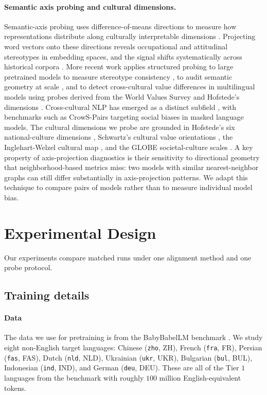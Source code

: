 \documentclass[11pt]{article}
\newcommand{\ZHtag}{\textsc{ZH}}
\newcommand{\FRtag}{\textsc{FR}}
\newcommand{\FAStag}{\textsc{FAS}}
\newcommand{\NLDtag}{\textsc{NLD}}
\newcommand{\UKRtag}{\textsc{UKR}}
\newcommand{\BULtag}{\textsc{BUL}}
\newcommand{\INDtag}{\textsc{IND}}
\newcommand{\DEUtag}{\textsc{DEU}}
\begin{document}
\paragraph{Semantic axis probing and cultural dimensions.} Semantic-axis probing uses difference-of-means directions to measure how representations distribute along culturally interpretable dimensions \citep{bolukbasi2016man,caliskan2017semantics,garg2018word}. Projecting word vectors onto these directions reveals occupational and attitudinal stereotypes in embedding spaces, and the signal shifts systematically across historical corpora \citep{garg2018word}. More recent work applies structured probing to large pretrained models to measure stereotype consistency \citep{nadeem2021stereoset}, to audit semantic geometry at scale \citep{liang2023holistic}, and to detect cross-cultural value differences in multilingual models using probes derived from the World Values Survey and Hofstede's dimensions \citep{arora2023probing}. Cross-cultural NLP has emerged as a distinct subfield \citep{hershcovich2022challenges}, with benchmarks such as CrowS-Pairs \citep{nangia2020crows} targeting social biases in masked language models. The cultural dimensions we probe are grounded in Hofstede's six national-culture dimensions \citep{hofstede2001culture}, Schwartz's cultural value orientations \citep{schwartz2006theory}, the Inglehart-Welzel cultural map \citep{inglehart2005modernization}, and the GLOBE societal-culture scales \citep{house2004culture}. A key property of axis-projection diagnostics is their sensitivity to directional geometry that neighborhood-based metrics miss: two models with similar nearest-neighbor graphs can still differ substantially in axis-projection patterns. We adapt this technique to compare pairs of models rather than to measure individual model bias.

\section{Experimental Design}
\label{sec:study-design}

Our experiments compare matched runs under one alignment method and one probe protocol.

\subsection{Training details}
\label{sec:training}

\paragraph{Data}
The data we use for pretraining is from the BabyBabelLM benchmark \citep{jumelet2025babybabellm}. We study eight non-English target languages: Chinese (\texttt{zho}, \ZHtag), French (\texttt{fra}, \FRtag), Persian (\texttt{fas}, \FAStag), Dutch (\texttt{nld}, \NLDtag), Ukrainian (\texttt{ukr}, \UKRtag), Bulgarian (\texttt{bul}, \BULtag), Indonesian (\texttt{ind}, \INDtag), and German (\texttt{deu}, \DEUtag). These are all of the Tier $1$ languages from the benchmark with roughly $100$ million English-equivalent tokens.
\end{document}
